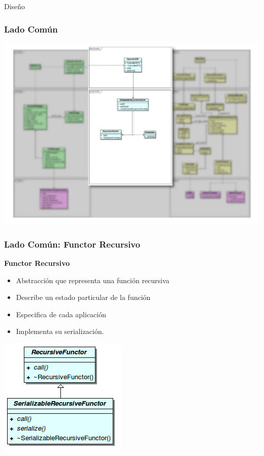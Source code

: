 \begin{subsection}{Diseño}
\begin{frame}\frametitle{Lado Común}
    \begin{center}
        \includegraphics[scale=0.25]{images/class-common-side.png}
    \end{center}
\end{frame}

\begin{frame}\frametitle{Lado Común: Functor Recursivo}%
    \textbf{Functor Recursivo}
    \begin{itemize}
     \item Abstracción que representa una función recursiva
     \item Describe un estado particular de la función
     \item Especifica de cada aplicación
     \item Implementa su serialización.
    \end{itemize}

    \begin{center}
        \includegraphics[scale=0.4]{images/srf.png}
    \end{center}
    

\end{frame}
\end{subsection}
